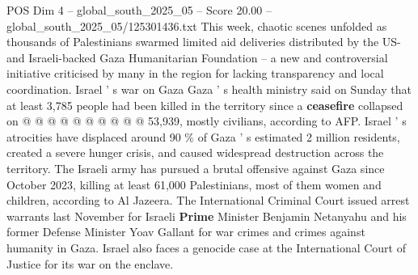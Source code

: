 \begin{textsample}{POS Dim 4 – global\_south\_2025\_05 – Score 20.00 – global\_south\_2025\_05/125301436.txt}
This week, chaotic scenes unfolded as thousands of Palestinians swarmed limited aid deliveries distributed by the US- and Israeli-backed Gaza Humanitarian Foundation -- a new and controversial initiative criticised by many in the region for lacking transparency and local coordination.
Israel ' s war on Gaza Gaza ' s health ministry said on Sunday that at least 3,785 people had been killed in the territory since a \textbf{ceasefire} collapsed on @ @ @ @ @ @ @ @ @ @ 53,939, mostly civilians, according to AFP.
Israel ' s atrocities have displaced around 90 \% of Gaza ' s estimated 2 million residents, created a severe hunger crisis, and caused widespread destruction across the territory.
The Israeli army has pursued a brutal offensive against Gaza since October 2023, killing at least 61,000 Palestinians, most of them women and children, according to Al Jazeera.
The International Criminal Court issued arrest warrants last November for Israeli \textbf{Prime} Minister Benjamin Netanyahu and his former Defense Minister Yoav Gallant for war crimes and crimes against humanity in Gaza.
Israel also faces a genocide case at the International Court of Justice for its war on the enclave.

\end{textsample}
